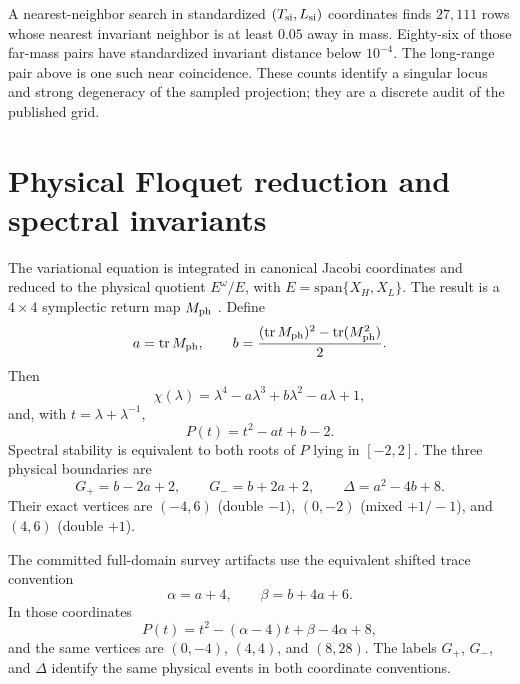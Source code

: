 \documentclass[aps,prl,onecolumn,amsmath,amssymb]{revtex4-2}
\begin{document}
A nearest-neighbor search in standardized $(T_{\rm si},L_{\rm si})$ coordinates
finds $27{,}111$ rows whose nearest invariant neighbor is at least $0.05$ away
in mass. Eighty-six of those far-mass pairs have standardized invariant
distance below $10^{-4}$. The long-range pair above is one such near
coincidence. These counts identify a singular locus and strong degeneracy of
the sampled projection; they are a discrete audit of the published grid.

\section{Physical Floquet reduction and spectral invariants}
\label{sec:floquet}

The variational equation is integrated in canonical Jacobi coordinates and
reduced to the physical quotient $E^{\omega}/E$, with
$E=\mathrm{span}\{X_H,X_L\}$. The result is a $4\times4$ symplectic return map
$M_{\rm ph}$
\cite{yakubovich1975,howard1987linear,frauenfelder2023symplectic,galan2002figureeight}.
Define
\begin{equation}
a=\operatorname{tr}M_{\rm ph},\qquad
b=\frac{(\operatorname{tr}M_{\rm ph})^2-
\operatorname{tr}(M_{\rm ph}^2)}{2}.
\end{equation}
Then
\begin{equation}
\chi(\lambda)=\lambda^4-a\lambda^3+b\lambda^2-a\lambda+1,
\end{equation}
and, with $t=\lambda+\lambda^{-1}$,
\begin{equation}
P(t)=t^2-at+b-2.
\end{equation}
Spectral stability is equivalent to both roots of $P$ lying in $[-2,2]$. The
three physical boundaries are
\begin{equation}
G_+=b-2a+2,\qquad G_-=b+2a+2,\qquad
\Delta=a^2-4b+8.
\end{equation}
Their exact vertices are $(-4,6)$ (double $-1$), $(0,-2)$ (mixed $+1/-1$),
and $(4,6)$ (double $+1$).

The committed full-domain survey artifacts use the equivalent shifted
trace convention
\begin{equation}
\alpha=a+4,\qquad \beta=b+4a+6.
\end{equation}
In those coordinates
\begin{equation}
P(t)=t^2-(\alpha-4)t+\beta-4\alpha+8,
\end{equation}
and the same vertices are $(0,-4)$, $(4,4)$, and $(8,28)$. The labels
$G_+$, $G_-$, and $\Delta$ identify the same physical events in both
coordinate conventions.
\end{document}
